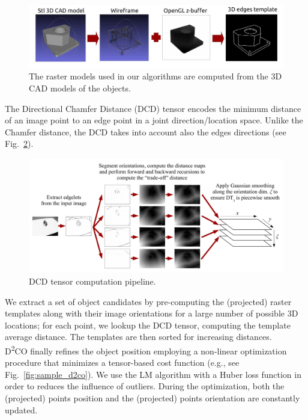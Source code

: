 \documentclass{llncs}
\begin{document}
\begin{figure}[t!]
\begin{center}
\includegraphics[angle=0,width=0.8\linewidth]{images/d2co_00.png}
\end{center}
\caption{The raster models used in our algorithms are computed from the 3D CAD models of the objects.}\label{fig:obj_model}
\end{figure}
The Directional Chamfer Distance (DCD) tensor encodes the minimum distance of an image point to an edge point in a joint direction/location space. Unlike the Chamfer distance, the DCD takes into account also the edges directions (see Fig.~\ref{fig:tensor}).

\begin{figure}[t!]
\begin{center}
\includegraphics[angle=0,width=\linewidth]{images/dcd_building.pdf}
\end{center}
\caption{DCD tensor computation pipeline.}\label{fig:tensor}
\end{figure}

We extract a set of object candidates by pre-computing the (projected) raster templates along with their image orientations for a large number of possible 3D locations; for each point, we lookup the DCD tensor, computing the template average distance. The templates are then sorted for increasing distances.\\

D\textsuperscript{2}CO finally refines the object position employing a non-linear optimization procedure that minimizes a tensor-based cost function (e.g., see Fig.~\ref{fig:sample_d2co}). We use the LM algorithm with a Huber loss function in order to reduces the influence of outliers. During the optimization, both the (projected) points position and the (projected) points orientation are constantly updated.
\end{document}
